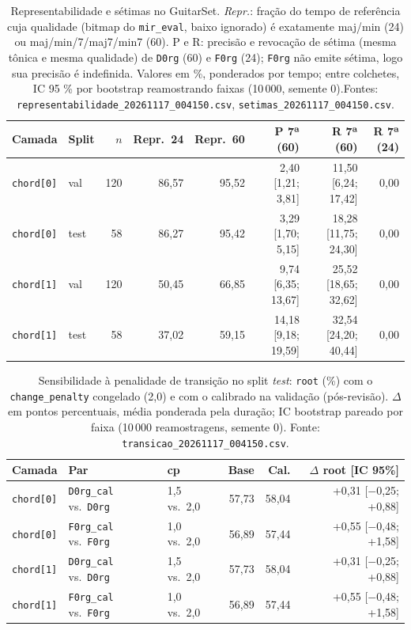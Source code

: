 \begin{table}[t]
  \centering
  \caption{Representabilidade e sétimas no GuitarSet. \emph{Repr.}: fração do tempo de referência cuja qualidade (bitmap do \texttt{mir\_eval}, baixo ignorado) é exatamente maj/min (24) ou maj/min/7/maj7/min7 (60). P e R: precisão e revocação de sétima (mesma tônica e mesma qualidade) de \texttt{D0rg} (60) e \texttt{F0rg} (24); \texttt{F0rg} não emite sétima, logo sua precisão é indefinida. Valores em \%, ponderados por tempo; entre colchetes, IC 95 \% por bootstrap reamostrando faixas (10\,000, semente 0).Fontes: \texttt{representabilidade\_20261117\_004150.csv}, \texttt{setimas\_20261117\_004150.csv}.}
  \label{tab:vocabulario}
  \footnotesize
  \begin{tabular}{llrrrrrr}
    \toprule
    Camada & Split & $n$ & Repr.\ 24 & Repr.\ 60 & P 7ª (60) & R 7ª (60) & R 7ª (24) \\
    \midrule
    \texttt{chord[0]} & val & 120 & 86,57 & 95,52 & 2,40 [1,21; 3,81] & 11,50 [6,24; 17,42] & 0,00 \\
    \texttt{chord[0]} & test & 58 & 86,27 & 95,42 & 3,29 [1,70; 5,15] & 18,28 [11,75; 24,30] & 0,00 \\
    \texttt{chord[1]} & val & 120 & 50,45 & 66,85 & 9,74 [6,35; 13,67] & 25,52 [18,65; 32,62] & 0,00 \\
    \texttt{chord[1]} & test & 58 & 37,02 & 59,15 & 14,18 [9,18; 19,59] & 32,54 [24,20; 40,44] & 0,00 \\
    \bottomrule
  \end{tabular}
\end{table}

\begin{table}[t]
  \centering
  \caption{Sensibilidade à penalidade de transição no split \emph{test}: \texttt{root} (\%) com o \texttt{change\_penalty} congelado (2,0) e com o calibrado na validação (pós-revisão). $\Delta$ em pontos percentuais, média ponderada pela duração; IC bootstrap pareado por faixa (10\,000 reamostragens, semente 0). Fonte: \texttt{transicao\_20261117\_004150.csv}.}
  \label{tab:transicao}
  \footnotesize
  \begin{tabular}{lllrrr}
    \toprule
    Camada & Par & cp & Base & Cal. & $\Delta$ root [IC 95\%] \\
    \midrule
    \texttt{chord[0]} & \texttt{D0rg\_cal} vs.\ \texttt{D0rg} & 1,5 vs.\ 2,0 & 57,73 & 58,04 & +0,31 [$-$0,25; +0,88] \\
    \texttt{chord[0]} & \texttt{F0rg\_cal} vs.\ \texttt{F0rg} & 1,0 vs.\ 2,0 & 56,89 & 57,44 & +0,55 [$-$0,48; +1,58] \\
    \texttt{chord[1]} & \texttt{D0rg\_cal} vs.\ \texttt{D0rg} & 1,5 vs.\ 2,0 & 57,73 & 58,04 & +0,31 [$-$0,25; +0,88] \\
    \texttt{chord[1]} & \texttt{F0rg\_cal} vs.\ \texttt{F0rg} & 1,0 vs.\ 2,0 & 56,89 & 57,44 & +0,55 [$-$0,48; +1,58] \\
    \bottomrule
  \end{tabular}
\end{table}
